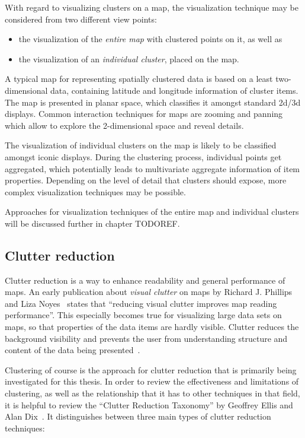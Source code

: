 With regard to visualizing clusters on a map, the visualization technique may be considered from two different view points:

\begin{itemize}

\item the visualization of the \textit{entire map} with clustered points on it, as well as

\item the visualization of an \textit{individual cluster}, placed on the map.

\end{itemize}

A typical map for representing spatially clustered data is based on a least two-dimensional data, containing latitude and longitude information of cluster items. The map is presented in planar space, which classifies it amongst standard 2d/3d displays. Common interaction techniques for maps are zooming and panning which allow to explore the 2-dimensional space and reveal details.

The visualization of individual clusters on the map is likely to be classified amongst iconic displays. During the clustering process, individual points get aggregated, which potentially leads to multivariate aggregate information of item properties. Depending on the level of detail that clusters should expose, more complex visualization techniques may be possible. 

Approaches for visualization techniques of the entire map and individual clusters will be discussed further in chapter TODOREF.

\subsection{Clutter reduction}
\label{clutter-reduction}

Clutter reduction is a way to enhance readability and general performance of maps. An early publication about \textit{visual clutter} on maps by Richard J. Phillips and Liza Noyes~\cite{phillips82clutter} states that ``reducing visual clutter improves map reading performance''. This especially becomes true for visualizing large data sets on maps, so that properties of the data items are hardly visible. Clutter reduces the background visibility and prevents the user from understanding structure and content of the data being presented~\cite{harvey2008primer, Delort10vis}.

Clustering of course is the approach for clutter reduction that is primarily being investigated for this thesis. In order to review the effectiveness and limitations of clustering, as well as the relationship that it has to other techniques in that field, it is helpful to review the ``Clutter Reduction Taxonomy'' by Geoffrey Ellis and Alan Dix~\cite{ellis08clutter}. It distinguishes between three main types of clutter reduction techniques:

